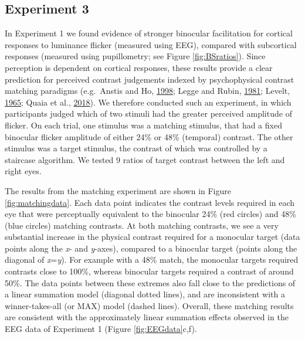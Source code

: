 \documentclass[
]{article}
\begin{document}
\hypertarget{experiment-3}{%
\subsection{Experiment 3}\label{experiment-3}}

In Experiment 1 we found evidence of stronger binocular facilitation for cortical responses to luminance flicker (measured using EEG), compared with subcortical responses (measured using pupillometry; see Figure \ref{fig:BSratios}). Since perception is dependent on cortical responses, these results provide a clear prediction for perceived contrast judgements indexed by psychophysical contrast matching paradigms (e.g.~Anstis and Ho, \protect\hyperlink{ref-Anstis1998}{1998}; Legge and Rubin, \protect\hyperlink{ref-Legge1981}{1981}; Levelt, \protect\hyperlink{ref-Levelt1965}{1965}; Quaia et al., \protect\hyperlink{ref-Quaia2018}{2018}). We therefore conducted such an experiment, in which participants judged which of two stimuli had the greater perceived amplitude of flicker. On each trial, one stimulus was a matching stimulus, that had a fixed binocular flicker amplitude of either 24\% or 48\% (temporal) contrast. The other stimulus was a target stimulus, the contrast of which was controlled by a staircase algorithm. We tested 9 ratios of target contrast between the left and right eyes.

The results from the matching experiment are shown in Figure \ref{fig:matchingdata}. Each data point indicates the contrast levels required in each eye that were perceptually equivalent to the binocular 24\% (red circles) and 48\% (blue circles) matching contrasts. At both matching contrasts, we see a very substantial increase in the physical contrast required for a monocular target (data points along the \emph{x}- and \emph{y}-axes), compared to a binocular target (points along the diagonal of \emph{x}=\emph{y}). For example with a 48\% match, the monocular targets required contrasts close to 100\%, whereas binocular targets required a contrast of around 50\%. The data points between these extremes also fall close to the predictions of a linear summation model (diagonal dotted lines), and are inconsistent with a winner-takes-all (or MAX) model (dashed lines). Overall, these matching results are consistent with the approximately linear summation effects observed in the EEG data of Experiment 1 (Figure \ref{fig:EEGdata}c,f).
\end{document}
